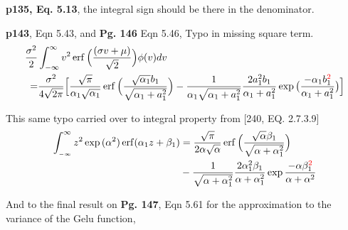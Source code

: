 \documentclass{article}
\DeclareMathOperator{\erf}{erf}
\begin{document}
\textbf{p135, Eq. 5.13}, the integral sign should be there in the denominator.


\textbf{p143}, Eqn 5.43, and \textbf{Pg. 146} Eqn 5.46, Typo in missing square term.
  \begin{align*}
    \frac{\sigma^{2}}{2} &\int_{-\infty} ^{\infty}v^{2} \erf\Big(\frac{(\sigma v + \mu)}{\sqrt{2}}\Big)\phi(v) dv \nonumber
    \\ = &\frac{\sigma^{2}}{4\sqrt{2\pi}} \Big[ \frac{\sqrt{\pi}}{\alpha_{1} \sqrt{\alpha_{1}}}
    \erf\Big({\frac{\sqrt{\alpha_{1}}b_{1}}{\sqrt{\alpha_{1} + a_{1}^{2}}}}\Big)
    -  \frac{1}{\alpha_{1}\sqrt{\alpha_{1} + a_{1}^{2}}} \frac{2a_{1}^{2}b_{1}}{\alpha_{1} + a_{1}^{2}}
    \exp{\big(\frac{-\alpha_{1} b_{1}^{\textcolor{red}{2}}}{\alpha_{1} + a_{1}^{2}}\big)} \Big]
  \end{align*}

  This same typo carried over to integral property from [240, EQ. 2.7.3.9]
  \begin{align*}
    \int_{_{-\infty}}^{\infty} z^{2}\exp{(\alpha^{2})} \erf(\alpha_{1}z + \beta_{1})
    &=
    \frac{\sqrt{\pi}}{2\alpha \sqrt{\alpha}}
      \erf\Big({\frac{\sqrt{\alpha}\beta_{1}}{\sqrt{\alpha + \alpha_{1}^{2}}}}\Big)
      \nonumber\\&
    -  \frac{1}{\sqrt{\alpha + \alpha_{1}^{2}}} \frac{2\alpha_{1}^{2} \beta_{1}}{\alpha + \alpha_{1}^{2}}
    \exp{\frac{-\alpha \beta_{1}^{\textcolor{red}{2}}}{\alpha + \alpha^{2}}}
  \end{align*}


  And to the final result on \textbf{Pg. 147}, Eqn 5.61 for the approximation to the variance of the Gelu function,
\end{document}
